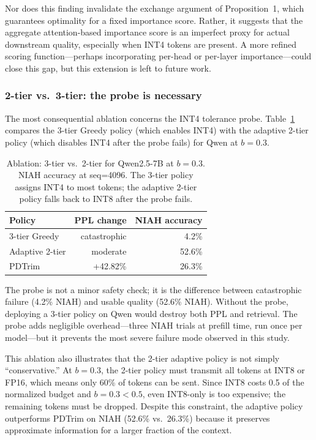 \documentclass[11pt]{article}
\newcommand{\budget}{b}
\newcommand{\pct}{\%}
\theoremstyle{plain}
\theoremstyle{definition}
\begin{document}
Nor does this finding invalidate the exchange argument of Proposition~1, which guarantees optimality for a fixed importance score.  Rather, it suggests that the aggregate attention-based importance score is an imperfect proxy for actual downstream quality, especially when INT4 tokens are present.  A more refined scoring function---perhaps incorporating per-head or per-layer importance---could close this gap, but this extension is left to future work.

\subsubsection{2-tier vs.\ 3-tier: the probe is necessary}
\label{sec:ablation-probe}

The most consequential ablation concerns the INT4 tolerance probe.  Table~\ref{tab:ablation-probe} compares the 3-tier Greedy policy (which enables INT4) with the adaptive 2-tier policy (which disables INT4 after the probe fails) for Qwen at $\budget=0.3$.

\begin{table}[t]
\centering
\caption{Ablation: 3-tier vs.\ 2-tier for Qwen2.5-7B at $\budget=0.3$.  NIAH accuracy at seq=4096.  The 3-tier policy assigns INT4 to most tokens; the adaptive 2-tier policy falls back to INT8 after the probe fails.}
\label{tab:ablation-probe}
\small
\begin{tabular}{lrr}
\toprule
Policy & PPL change & NIAH accuracy \\
\midrule
3-tier Greedy & catastrophic & 4.2\pct{} \\
Adaptive 2-tier & moderate & 52.6\pct{} \\
PDTrim & +42.82\pct{} & 26.3\pct{} \\
\bottomrule
\end{tabular}
\end{table}

The probe is not a minor safety check; it is the difference between catastrophic failure (4.2\pct{} NIAH) and usable quality (52.6\pct{} NIAH).  Without the probe, deploying a 3-tier policy on Qwen would destroy both PPL and retrieval.  The probe adds negligible overhead---three NIAH trials at prefill time, run once per model---but it prevents the most severe failure mode observed in this study.

This ablation also illustrates that the 2-tier adaptive policy is not simply ``conservative.''  At $\budget=0.3$, the 2-tier policy must transmit all tokens at INT8 or FP16, which means only 60\pct{} of tokens can be sent.  Since INT8 costs 0.5 of the normalized budget and $\budget=0.3 < 0.5$, even INT8-only is too expensive; the remaining tokens must be dropped.  Despite this constraint, the adaptive policy outperforms PDTrim on NIAH (52.6\pct{} vs.\ 26.3\pct{}) because it preserves approximate information for a larger fraction of the context.
\end{document}
